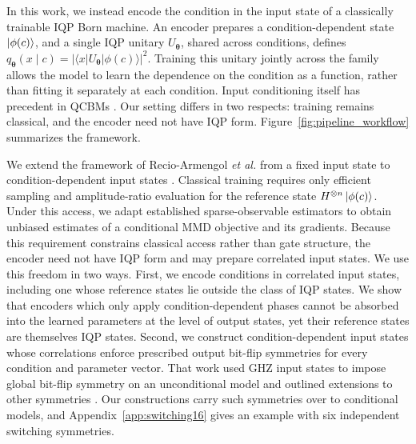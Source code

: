 \documentclass[pra,aps,10pt,twocolumn,floatfix,superscriptaddress, notitlepage,longbibliography]{revtex4-2}
\begin{document}
In this work, we instead encode the condition in the input state of a classically trainable IQP Born machine. An encoder prepares a condition-dependent state $\ket{\phi(c)}$, and a single IQP unitary $U_{\boldsymbol\theta}$, shared across conditions, defines $q_{\boldsymbol\theta}(x\mid c)=|\langle x|U_{\boldsymbol\theta}|\phi(c)\rangle|^2$. Training this unitary jointly across the family allows the model to learn the dependence on the condition as a function, rather than fitting it separately at each condition. Input conditioning itself has precedent in QCBMs \cite{kissConditionalBornMachine2022}. Our setting differs in two respects: training remains classical, and the encoder need not have IQP form. Figure~\ref{fig:pipeline_workflow} summarizes the framework.

We extend the framework of Recio-Armengol \textit{et al.} from a fixed input state to condition-dependent input states \cite{recio-armengolTrainClassicalDeploy2026}. Classical training requires only efficient sampling and amplitude-ratio evaluation for the reference state $H^{\otimes n}\ket{\phi(c)}$. Under this access, we adapt established sparse-observable estimators \cite{nestSimulatingQuantumComputers2011,havlicekAmplitudeRatiosNeural2023} to obtain unbiased estimates of a conditional MMD objective and its gradients. Because this requirement constrains classical access rather than gate structure, the encoder need not have IQP form and may prepare correlated input states. We use this freedom in two ways. First, we encode conditions in correlated input states, including one whose reference states lie outside the class of IQP states. We show that encoders which only apply condition-dependent phases cannot be absorbed into the learned parameters at the level of output states, yet their reference states are themselves IQP states. Second, we construct condition-dependent input states whose correlations enforce prescribed output bit-flip symmetries for every condition and parameter vector. That work used GHZ input states to impose global bit-flip symmetry on an unconditional model and outlined extensions to other symmetries \cite{recio-armengolTrainClassicalDeploy2026}. Our constructions carry such symmetries over to conditional models, and Appendix~\ref{app:switching16} gives an example with six independent switching symmetries.
\end{document}
